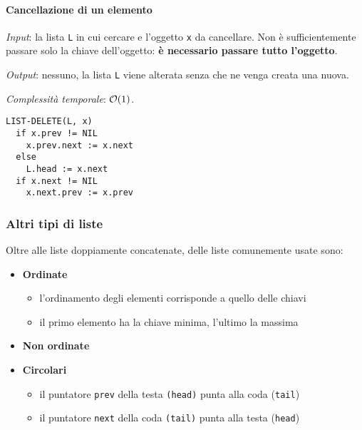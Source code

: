 \documentclass[italian, 10pt]{article}
\begin{document}
\paragraph{Cancellazione di un elemento}

\textit{Input}: la lista \texttt{L} in cui cercare e l'oggetto \texttt{x} da cancellare.
Non è sufficientemente passare solo la chiave dell'oggetto: \textbf{è necessario passare tutto l'oggetto}.

\textit{Output}: nessuno, la lista \texttt{L} viene alterata senza che ne venga creata una nuova.

\textit{Complessità temporale}: \(\mathcal{O}(1)\).

\begin{lstlisting}[style=pseudocode, caption={Pseudocodice dell'algoritmo \texttt{LIST-DELETE}}, label={lst:list-delete}]
LIST-DELETE(L, x)
  if x.prev != NIL
    x.prev.next := x.next
  else
    L.head := x.next
  if x.next != NIL
    x.next.prev := x.prev
  \end{lstlisting}

\subsubsection{Altri tipi di liste}

Oltre alle liste doppiamente concatenate, delle liste comunemente usate sono:

\begin{itemize}
  \item \textbf{Ordinate}
        \begin{itemize}
          \item l'ordinamento degli elementi corrisponde a quello delle chiavi
          \item il primo elemento ha la chiave minima, l'ultimo la massima
        \end{itemize}
  \item \textbf{Non ordinate}
  \item \textbf{Circolari}
        \begin{itemize}
          \item il puntatore \texttt{prev} della testa \texttt{(\texttt{head})} punta alla coda (\texttt{tail})
          \item il puntatore \texttt{next} della coda \texttt{(\texttt{tail})} punta alla testa (\texttt{head})
        \end{itemize}
\end{itemize}
\end{document}
